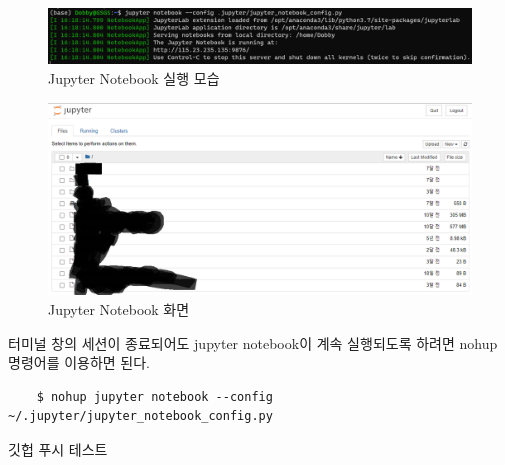 \begin{figure}[H]
	\begin{center}
        \includegraphics[width=0.6\linewidth]{jupyter_notebook_running}
        \caption{Jupyter Notebook 실행 모습}
    \end{center}
\end{figure}

\begin{figure}[H]
	\begin{center}
        \includegraphics[width=0.8\linewidth]{jupyter_notebook_display}
        \caption{Jupyter Notebook 화면}
    \end{center}
\end{figure}

터미널 창의 세션이 종료되어도 jupyter notebook이 계속 실행되도록 하려면 nohup 명령어를 이용하면 된다.
\begin{lstlisting}
    $ nohup jupyter notebook --config ~/.jupyter/jupyter_notebook_config.py
\end{lstlisting}

깃헙 푸시 테스트